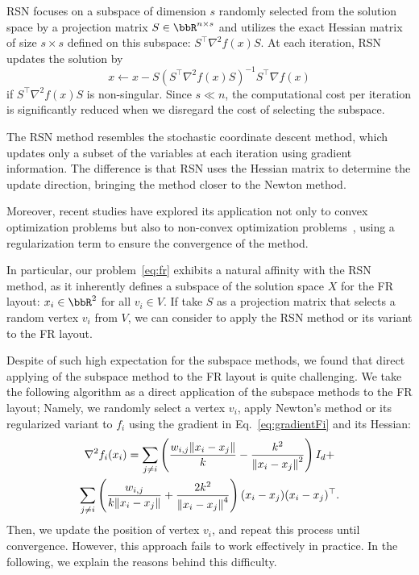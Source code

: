 \documentclass[dvipdfmx,journal]{IEEEtran}
\begin{document}
RSN focuses on a subspace of dimension $s$ randomly selected from the solution space by a projection matrix $S \in \bbR^{n \times s}$ and utilizes the exact Hessian matrix of size $s \times s$ defined on this subspace: $S^\top \nabla^2 f(x) S$.
At each iteration, RSN updates the solution by
\begin{equation*}
  x \gets x - S (S^\top \nabla^2 f(x) S)^{-1} S^\top \nabla f(x)
\end{equation*}
if $S^\top \nabla^2 f(x) S$ is non-singular.
Since $s \ll n$, the computational cost per iteration is significantly reduced when we disregard the cost of selecting the subspace.

The RSN method resembles the stochastic coordinate descent method, which updates only a subset of the variables at each iteration using gradient information.
The difference is that RSN uses the Hessian matrix to determine the update direction, bringing the method closer to the Newton method.

Moreover, recent studies have explored its application not only to convex optimization problems but also to non-convex optimization problems~\cite{fujiRandomizedSubspaceRegularized2022}, using a regularization term to ensure the convergence of the method.

In particular, our problem~\eqref{eq:fr} exhibits a natural affinity with the RSN method, as it inherently defines a subspace of the solution space $X$ for the FR layout: $x_i \in \bbR^2$ for all $v_i \in V$.
If take $S$ as a projection matrix that selects a random vertex $v_i$ from $V$, we can consider to apply the RSN method or its variant to the FR layout.

Despite of such high expectation for the subspace methods, we found that direct applying of the subspace method to the FR layout is quite challenging.
We take the following algorithm as a direct application of the subspace methods to the FR layout; Namely, we randomly select a vertex $v_i$, apply Newton's method or its regularized variant to $f_i$ using the gradient in Eq.~\eqref{eq:gradientFi} and its Hessian:
\begin{gather*}
  \nabla^2 f_i(x_i) = \sum_{j \neq i} \left(\frac{w_{i,j}\norm{x_i - x_j}}{k} - \frac{k^2}{\norm{x_i - x_j}^2}\right) I_d + \\
  \sum_{j \neq i} \left(\frac{w_{i,j}}{k \norm{x_i - x_j}} + \frac{2k^2}{\norm{x_i - x_j}^4}\right) (x_i - x_j)(x_i - x_j)^\top.
\end{gather*}
Then, we update the position of vertex $v_i$, and repeat this process until convergence.
However, this approach fails to work effectively in practice.
In the following, we explain the reasons behind this difficulty.
\end{document}
